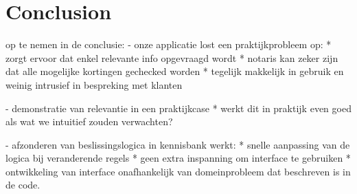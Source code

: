 \section{Conclusion}
op te nemen in de conclusie:
- onze applicatie lost een praktijkprobleem op:
* zorgt ervoor dat enkel relevante info opgevraagd wordt
* notaris kan zeker zijn dat alle mogelijke kortingen gechecked worden
* tegelijk makkelijk in gebruik en weinig intrusief in bespreking met klanten

- demonstratie van relevantie in een praktijkcase
* werkt dit in praktijk even goed als wat we intuitief zouden verwachten?

- afzonderen van beslissingslogica in kennisbank werkt:
* snelle aanpassing van de logica bij veranderende regels
* geen extra inspanning om interface te gebruiken
* ontwikkeling van interface onafhankelijk van domeinprobleem dat beschreven is in de code.